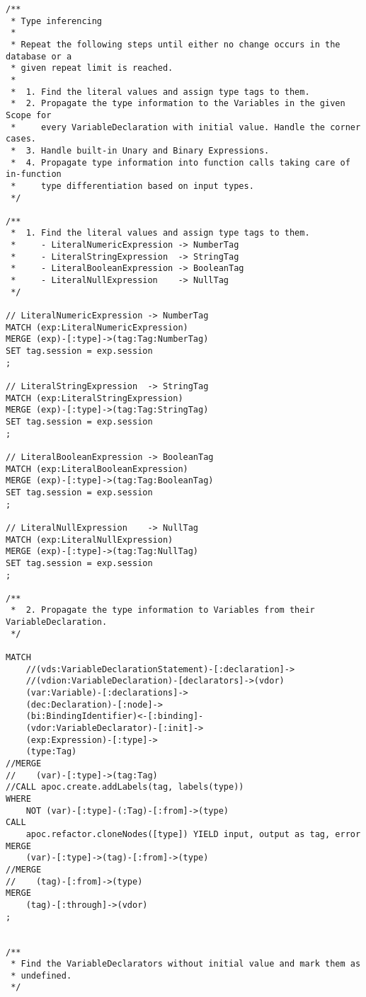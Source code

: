\begin{lstlisting}
/**
 * Type inferencing
 *
 * Repeat the following steps until either no change occurs in the database or a
 * given repeat limit is reached.
 *
 *  1. Find the literal values and assign type tags to them.
 *  2. Propagate the type information to the Variables in the given Scope for
 *     every VariableDeclaration with initial value. Handle the corner cases.
 *  3. Handle built-in Unary and Binary Expressions.
 *  4. Propagate type information into function calls taking care of in-function
 *     type differentiation based on input types.
 */

/**
 *  1. Find the literal values and assign type tags to them.
 *     - LiteralNumericExpression -> NumberTag
 *     - LiteralStringExpression  -> StringTag
 *     - LiteralBooleanExpression -> BooleanTag
 *     - LiteralNullExpression    -> NullTag
 */

// LiteralNumericExpression -> NumberTag
MATCH (exp:LiteralNumericExpression)
MERGE (exp)-[:type]->(tag:Tag:NumberTag)
SET tag.session = exp.session
;

// LiteralStringExpression  -> StringTag
MATCH (exp:LiteralStringExpression)
MERGE (exp)-[:type]->(tag:Tag:StringTag)
SET tag.session = exp.session
;

// LiteralBooleanExpression -> BooleanTag
MATCH (exp:LiteralBooleanExpression)
MERGE (exp)-[:type]->(tag:Tag:BooleanTag)
SET tag.session = exp.session
;

// LiteralNullExpression    -> NullTag
MATCH (exp:LiteralNullExpression)
MERGE (exp)-[:type]->(tag:Tag:NullTag)
SET tag.session = exp.session
;

/**
 *  2. Propagate the type information to Variables from their VariableDeclaration.
 */

MATCH
    //(vds:VariableDeclarationStatement)-[:declaration]->
    //(vdion:VariableDeclaration)-[declarators]->(vdor)
    (var:Variable)-[:declarations]->
    (dec:Declaration)-[:node]->
    (bi:BindingIdentifier)<-[:binding]-
    (vdor:VariableDeclarator)-[:init]->
    (exp:Expression)-[:type]->
    (type:Tag)
//MERGE
//    (var)-[:type]->(tag:Tag)
//CALL apoc.create.addLabels(tag, labels(type))
WHERE
    NOT (var)-[:type]-(:Tag)-[:from]->(type)
CALL
    apoc.refactor.cloneNodes([type]) YIELD input, output as tag, error
MERGE
    (var)-[:type]->(tag)-[:from]->(type)
//MERGE
//    (tag)-[:from]->(type)
MERGE
    (tag)-[:through]->(vdor)
;


/**
 * Find the VariableDeclarators without initial value and mark them as
 * undefined.
 */


\end{lstlisting}
